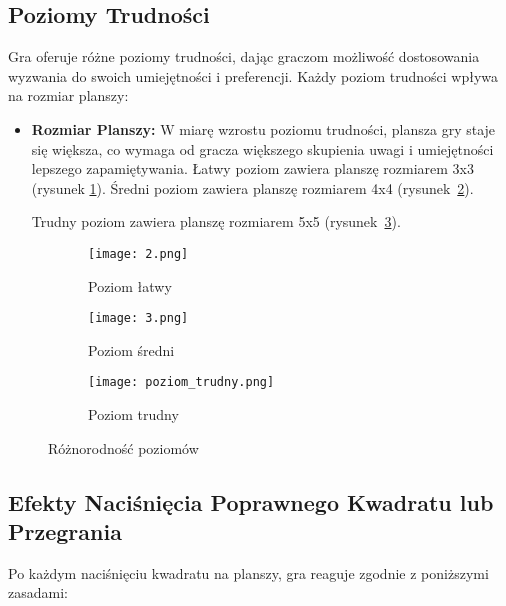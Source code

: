\documentclass[]{report}
\begin{document}
	
\subsection* {Poziomy Trudności}

Gra oferuje różne poziomy trudności, dając graczom możliwość dostosowania wyzwania do swoich umiejętności i preferencji. Każdy poziom trudności wpływa na  rozmiar planszy:

\begin{itemize}
	\item \textbf{Rozmiar Planszy:} W miarę wzrostu poziomu trudności, plansza gry staje się większa, co wymaga od gracza większego skupienia uwagi i umiejętności lepszego zapamiętywania.
	\subitem Łatwy poziom zawiera planszę rozmiarem 3x3 (rysunek \ref{fig:1}). 
	\subitem Średni poziom zawiera planszę rozmiarem 4x4 (rysunek~\ref{fig:2}). 
	

	\subitem Trudny poziom zawiera planszę rozmiarem 5x5 (rysunek~\ref{fig:3}). 
\end{itemize}
	
\begin{figure}[h]
	\centering
	\begin{subfigure}{0.28\textwidth}
		\centering
		\texttt{[image: 2.png]}
		\caption{Poziom łatwy}
		\label{fig:1}
	\end{subfigure}
	\begin{subfigure}{0.3\textwidth}
		\centering
		\texttt{[image: 3.png]}
		\caption{Poziom średni}
		\label{fig:2}
	\end{subfigure}
	\begin{subfigure}{0.32\textwidth}
		\centering
		\texttt{[image: poziom\_trudny.png]}
		\caption{Poziom trudny}
		\label{fig:3}
	\end{subfigure}
	\caption{Różnorodność poziomów}
	\label{fig:Różnorodność poziomów}
\end{figure}

	

\newpage

\subsection*{Efekty Naciśnięcia Poprawnego Kwadratu lub Przegrania}


Po każdym naciśnięciu kwadratu na planszy, gra reaguje zgodnie z poniższymi zasadami:
\end{document}
